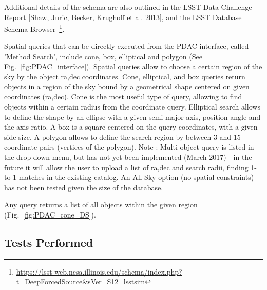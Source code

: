 \documentclass[DM,lsstdraft,toc]{lsstdoc}
\begin{document}
Additional details of the schema are also outlined in the LSST Data Challenge Report [Shaw, Juric, Becker, Krughoff et al. 2013], and the LSST Database Schema Browser~\footnote{\url{https://lsst-web.ncsa.illinois.edu/schema/index.php?t=DeepForcedSource&sVer=S12_lsstsim}}.


Spatial queries that can be directly executed from the PDAC interface, called 'Method Search',  include cone, box, elliptical and polygon (See Fig.~\ref{fig:PDAC_interface}).  Spatial queries allow to choose a certain region of the sky by the object ra,dec coordinates.
Cone, elliptical, and box queries  return objects in a region of the sky bound by a geometrical shape centered on given coordinates (ra,dec). Cone is the most useful type of query, allowing to find objects within a certain radius from the coordinate query.  Elliptical search allows to define the shape by an ellipse with a given semi-major axis,  position angle and the axis ratio. A box is a square centered on the query coordinates, with a given side size.  A polygon allows to define the search region by between 3 and 15 coordinate pairs (vertices of the polygon). Note : Multi-object query is listed in the drop-down menu, but has not yet been implemented (March 2017) - in the future it will allow the user to upload a list of ra,dec and search radii,  finding 1-to-1 matches in the existing catalog. An All-Sky option (no spatial constraints) has not been tested given the size of the database.

Any query returns a list of all objects within the given region (Fig.~\ref{fig:PDAC_cone_DS}).


\subsection{Tests Performed}
\end{document}
